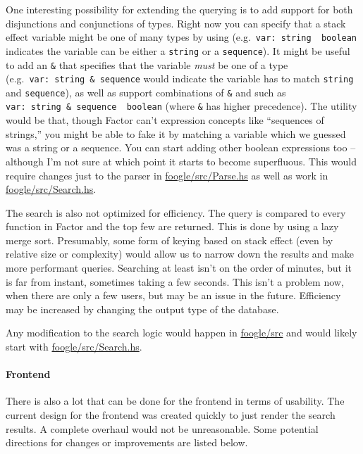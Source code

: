 \documentclass[
]{article}
\begin{document}
One interesting possibility for extending the querying is to add support
for both disjunctions and conjunctions of types. Right now you can
specify that a stack effect variable might be one of many types by using
\texttt{\textbar{}} (e.g.~\texttt{var:\ string\ \textbar{}\ boolean}
indicates the variable can be either a \texttt{string} or a
\texttt{sequence}). It might be useful to add an \texttt{\&} that
specifies that the variable \emph{must} be one of a type
(e.g.~\texttt{var:\ string\ \&\ sequence} would indicate the variable
has to match \texttt{string} and \texttt{sequence}), as well as support
combinations of \texttt{\&} and \texttt{\textbar{}} such as
\texttt{var:\ string\ \&\ sequence\ \textbar{}\ boolean} (where
\texttt{\&} has higher precedence). The utility would be that, though
Factor can't expression concepts like ``sequences of strings,'' you
might be able to fake it by matching a variable which we guessed was a
string or a sequence. You can start adding other boolean expressions too
-- although I'm not sure at which point it starts to become superfluous.
This would require changes just to the parser in
\href{https://github.com/factor-hmc/foogle/blob/master/src/Parse.hs}{foogle/src/Parse.hs}
as well as work in
\href{https://github.com/factor-hmc/foogle/blob/master/src/Search.hs}{foogle/src/Search.hs}.

The search is also not optimized for efficiency. The query is compared
to every function in Factor and the top few are returned. This is done
by using a lazy merge sort. Presumably, some form of keying based on
stack effect (even by relative size or complexity) would allow us to
narrow down the results and make more performant queries. Searching at
least isn't on the order of minutes, but it is far from instant,
sometimes taking a few seconds. This isn't a problem now, when there are
only a few users, but may be an issue in the future. Efficiency may be
increased by changing the output type of the database.

Any modification to the search logic would happen in
\href{https://github.com/factor-hmc/foogle/tree/master/src}{foogle/src}
and would likely start with
\href{https://github.com/factor-hmc/foogle/blob/master/src/Search.hs}{foogle/src/Search.hs}.

\hypertarget{frontend-1}{%
\paragraph{Frontend}\label{frontend-1}}

There is also a lot that can be done for the frontend in terms of
usability. The current design for the frontend was created quickly to
just render the search results. A complete overhaul would not be
unreasonable. Some potential directions for changes or improvements are
listed below.
\end{document}
